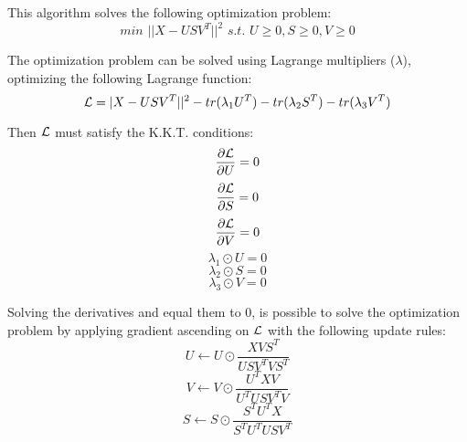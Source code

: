 \documentclass[paper=a4, fontsize=11pt]{scrartcl} %
\numberwithin{equation}{section} %
\numberwithin{figure}{section} %
\numberwithin{table}{section} %
\begin{document}
This algorithm solves the following optimization problem:
$$\textit{min } ||X - USV^T||^2 \textit{ s.t. } U \geq 0, S \geq 0, V \geq 0$$

The optimization problem can be solved using Lagrange multipliers ($\lambda$), optimizing the following Lagrange function:
$${\cal L} = |X - USV^T||^2 - tr(\lambda_1U^T) - tr(\lambda_2S^T) - tr(\lambda_3V^T)$$

Then ${\cal L}$ must satisfy the K.K.T. conditions:
$$\frac{\partial {\cal L}}{\partial U} = 0$$
$$\frac{\partial {\cal L}}{\partial S} = 0$$
$$\frac{\partial {\cal L}}{\partial V} = 0$$
$$\lambda_1 \odot U = 0$$
$$\lambda_2 \odot S = 0$$
$$\lambda_3 \odot V = 0$$

Solving the derivatives and equal them to $0$, is possible to solve the optimization problem by applying gradient ascending on ${\cal L}$ with the following update rules:
$$U \gets U \odot \frac{XVS^T}{USV^TVS^T}$$
$$V \gets V \odot \frac{U^TXV}{U^TUSV^TV}$$
$$S \gets S \odot \frac{S^TU^TX}{S^TU^TUSV^T}$$
\end{document}
